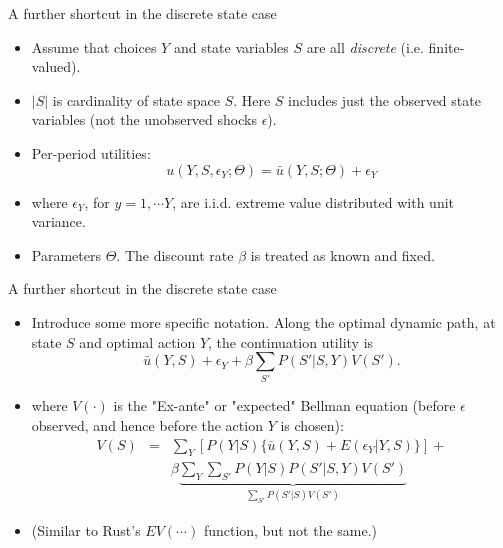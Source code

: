 \documentclass[xcolor=pdftex,dvipsnames,table,mathserif]{beamer}
\begin{document}
\begin{frame}{A further shortcut in the discrete state case}
\begin{itemize}
\item Assume that choices $Y$ and state variables $S$ are all \emph{discrete} (i.e. finite-valued).
\item  $|S|$ is cardinality of state space $S$. Here $S$ includes just the observed state variables (not  the unobserved shocks $\epsilon$). 
\item Per-period utilities:
\begin{equation*}
u(Y, S, \epsilon_Y; \Theta) = \bar u (Y, S; \Theta) + \epsilon_Y
\end{equation*}
\item where $\epsilon_Y$, for $y=1, \cdots Y$, are i.i.d. extreme value distributed with unit variance. \\
\item Parameters $\Theta$. The discount rate $\beta$ is treated as known and fixed. \\
\end{itemize}
\end{frame}

\begin{frame}{A further shortcut in the discrete state case}
\begin{itemize}
\item Introduce some more specific notation. Along the optimal dynamic path, at state $S$ and optimal action $Y$, the continuation utility is
\begin{equation*}
\bar u (Y,S) + \epsilon_Y + \beta \sum_{S'} P(S' | S, Y) V(S').
\end{equation*}
\item where $V(\cdot)$ is the "Ex-ante" or "expected" Bellman equation (before $\epsilon$ observed, and hence before the action $Y$ is chosen):
\begin{eqnarray}
\nonumber V(S) &= & \sum_Y [ P(Y|S) \{ \bar u (Y,S) + E(\epsilon_Y | Y, S) \} ] +\\ 
&& \beta \underbrace{\sum_Y \sum_{S'} P(Y|S) P(S'|S, Y) V(S')}_{\sum_{S'} P(S' | S) V(S') }  
\end{eqnarray}
\item (Similar to Rust's $EV(\cdots)$ function, but \alert{not the same}.)
\end{itemize}
\end{frame}
\end{document}
